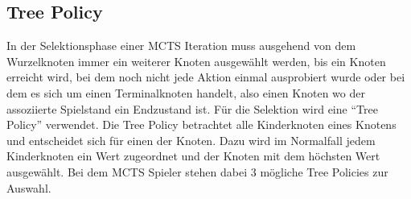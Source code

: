 \subsection{Tree Policy}

In der Selektionsphase einer \ac{MCTS} Iteration muss ausgehend von dem Wurzelknoten immer ein weiterer Knoten ausgewählt werden, bis ein Knoten erreicht wird, bei dem noch nicht jede Aktion einmal ausprobiert wurde oder bei dem es sich um einen Terminalknoten handelt, also einen Knoten wo der assoziierte Spielstand ein Endzustand ist. Für die Selektion wird eine \enquote{Tree Policy} verwendet. Die Tree Policy betrachtet alle Kinderknoten eines Knotens und entscheidet sich für einen der Knoten. Dazu wird im Normalfall jedem Kinderknoten ein Wert zugeordnet und der Knoten mit dem höchsten Wert ausgewählt. Bei dem \ac{MCTS} Spieler stehen dabei 3 mögliche Tree Policies zur Auswahl.

